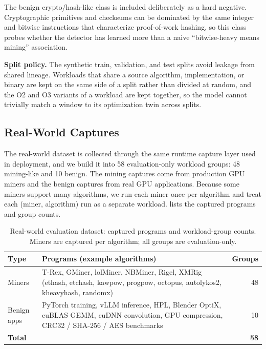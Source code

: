 The benign crypto/hash-like class is included deliberately as a hard negative. Cryptographic primitives and checksums can be dominated by the same integer and bitwise instructions that characterize proof-of-work hashing, so this class probes whether the detector has learned more than a naive ``bitwise-heavy means mining'' association.

\textbf{Split policy.}
The synthetic train, validation, and test splits avoid leakage from shared lineage. Workloads that share a source algorithm, implementation, or binary are kept on the same side of a split rather than divided at random, and the O2 and O3 variants of a workload are kept together, so the model cannot trivially match a window to its optimization twin across splits.

\subsection{Real-World Captures}

The real-world dataset is collected through the same runtime capture layer used in deployment, and we build it into 58 evaluation-only workload groups: 48 mining-like and 10 benign. The mining captures come from production GPU miners and the benign captures from real GPU applications. Because some miners support many algorithms, we run each miner once per algorithm and treat each (miner, algorithm) run as a separate workload.  lists the captured programs and group counts.

\begin{table}[t]
    \centering
    \caption{Real-world evaluation dataset: captured programs and workload-group counts. Miners are captured per algorithm; all groups are evaluation-only.}
    \label{tab:realworld_programs}
    \begin{tabular}{@{}l p{5.0cm} r@{}}
        \toprule
        Type & Programs (example algorithms) & Groups \\
        \midrule
        Miners & T-Rex, GMiner, lolMiner, NBMiner, Rigel, XMRig \newline (ethash, etchash, kawpow, progpow, octopus, autolykos2, kheavyhash, randomx) & 48 \\
        \midrule
        Benign apps & PyTorch training, vLLM inference, HPL, Blender OptiX, cuBLAS GEMM, cuDNN convolution, GPU compression, CRC32 / SHA-256 / AES benchmarks & 10 \\
        \midrule
        \textbf{Total} & & \textbf{58} \\
        \bottomrule
    \end{tabular}
\end{table}

